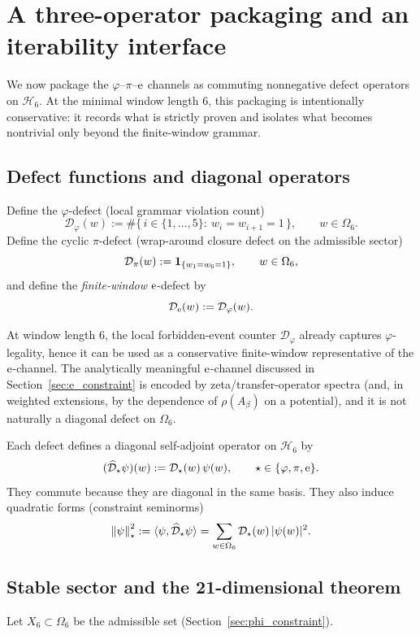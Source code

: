 
\section{A three-operator packaging and an iterability interface}
\label{sec:three_operator}

We now package the $\varphi$--$\pi$--$\mathrm{e}$ channels as commuting nonnegative defect operators on $\mathcal{H}_6$.
At the minimal window length $6$, this packaging is intentionally conservative: it records what is strictly proven and isolates what becomes nontrivial only beyond the finite-window grammar.

\subsection{Defect functions and diagonal operators}
Define the $\varphi$-defect (local grammar violation count)
\[
\mathcal{D}_\varphi(w):=\#\{\,i\in\{1,\dots,5\}:\ w_i=w_{i+1}=1\,\},
\qquad w\in\Omega_6.
\]
Define the cyclic $\pi$-defect (wrap-around closure defect on the admissible sector)
\[
\mathcal{D}_\pi(w):=\mathbf{1}_{\{w_1=w_6=1\}},
\qquad w\in\Omega_6,
\]
and define the \emph{finite-window} $\mathrm{e}$-defect by
\[
\mathcal{D}_{\mathrm{e}}(w):=\mathcal{D}_\varphi(w).
\]
\begin{remark}
At window length $6$, the local forbidden-event counter $\mathcal{D}_\varphi$ already captures $\varphi$-legality, hence it can be used as a conservative finite-window representative of the $\mathrm{e}$-channel.
The analytically meaningful $\mathrm{e}$-channel discussed in Section~\ref{sec:e_constraint} is encoded by zeta/transfer-operator spectra (and, in weighted extensions, by the dependence of $\rho(A_\beta)$ on a potential), and it is not naturally a diagonal defect on $\Omega_6$.
\end{remark}

Each defect defines a diagonal self-adjoint operator on $\mathcal{H}_6$ by
\[
(\widehat{\mathcal{D}}_\star \psi)(w):=\mathcal{D}_\star(w)\,\psi(w),
\qquad \star\in\{\varphi,\pi,\mathrm{e}\}.
\]
They commute because they are diagonal in the same basis.
They also induce quadratic forms (constraint seminorms)
\[
\left\lVert \psi\right\rVert_\star^2:=\langle \psi,\widehat{\mathcal{D}}_\star \psi\rangle
=\sum_{w\in\Omega_6}\mathcal{D}_\star(w)\,|\psi(w)|^2.
\]

\subsection{Stable sector and the 21-dimensional theorem}
Let $X_6\subset\Omega_6$ be the admissible set (Section~\ref{sec:phi_constraint}).

